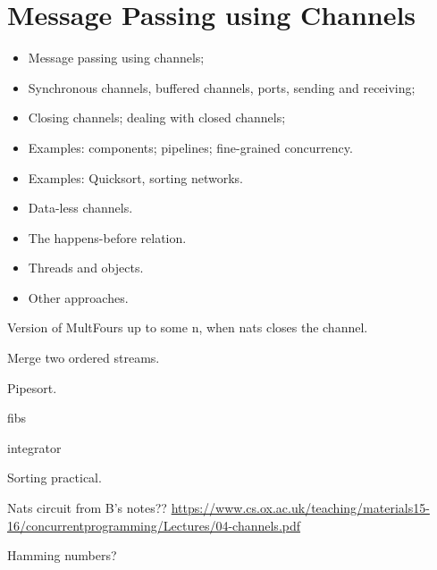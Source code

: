 \chapter{Message Passing using Channels} 






\begin{slide}

\begin{itemize}
\item 
Message passing using channels;

\item
Synchronous channels, buffered channels, ports, sending and receiving;

\item
Closing channels; dealing with closed channels;

\item
Examples: components; pipelines; fine-grained concurrency.

\item Examples: Quicksort, sorting networks.

\item 
Data-less channels.

\item
The happens-before relation.

\item
Threads and objects.

\item
Other approaches.
\end{itemize}
\end{slide}



\exercises

Version of MultFours up to some n, when nats closes the channel.

Merge two ordered streams.

Pipesort.

fibs

integrator

Sorting practical.

Nats circuit from B's notes?? 
\url{https://www.cs.ox.ac.uk/teaching/materials15-16/concurrentprogramming/Lectures/04-channels.pdf}

Hamming numbers?
